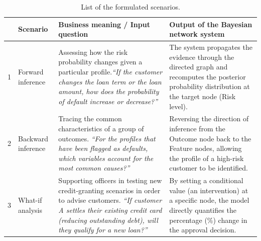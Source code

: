 \begin{table}[htbp]
\centering
\caption{List of the formulated scenarios.}
\label{tab:tinh_huong_hoi_dap}
\vspace{0.5em}
\small %
\begin{tabularx}{\textwidth}{c p{3.2cm} X X}
\toprule
\textbf{} & \textbf{Scenario} & \textbf{Business meaning / Input question} & \textbf{Output of the Bayesian network system} \\
\midrule
1 & Forward inference & 
Assessing how the risk probability changes given a particular profile.\newline \newline \textit{``If the customer changes the loan term or the loan amount, how does the probability of default increase or decrease?''} & 
The system propagates the evidence through the directed graph and recomputes the posterior probability distribution at the target node (Risk level). \\
\midrule
2 & Backward inference & 
Tracing the common characteristics of a group of outcomes. \newline \newline 
\textit{``For the profiles that have been flagged as defaults, which variables account for the most common causes?''} & 
Reversing the direction of inference from the Outcome node back to the Feature nodes, allowing the profile of a high-risk customer to be identified. \\
\midrule
3 & What-if analysis & 
Supporting officers in testing new credit-granting scenarios in order to advise customers. \newline\newline 
\textit{``If customer A settles their existing credit card (reducing outstanding debt), will they qualify for a new loan?''} & 
By setting a conditional value (an intervention) at a specific node, the model directly quantifies the percentage (\%) change in the approval decision. \\
\bottomrule
\end{tabularx}
\end{table}

